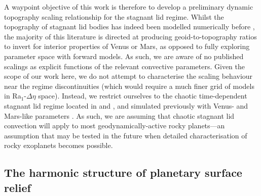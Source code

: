 A waypoint objective of this work is therefore to develop a preliminary dynamic topography scaling relationship for the stagnant lid regime. Whilst the topography of  stagnant lid bodies has indeed been modelled numerically before \citep{moresi_interpreting_1995, solomatov_stagnant_1996, vezolainen_timing_2003, vezolainen_uplift_2004, orth_isostatic_2011, golle_topography_2012, huang_constraints_2013}, the majority of this literature is directed at producing geoid-to-topography ratios to invert for interior properties of Venus or Mars, as opposed to fully exploring parameter space with forward models. As such, we are aware of no published scalings as explicit functions of the relevant convective parameters. Given the scope of our work here, we do not attempt to characterise the scaling behaviour near the regime discontinuities (which would require a much finer grid of models in Ra$_1$-$\Delta \eta$ space). Instead, we restrict ourselves to the chaotic time-dependent stagnant lid regime located in \citet{moresi_numerical_1995} and \citet{orth_isostatic_2011}, and simulated previously with Venus- and Mars-like parameters \citep{solomatov_scaling_2000, hauck_thermal_2002, reese_scaling_2005, orth_isostatic_2011}. As such, we are assuming that chaotic stagnant lid convection will apply to most geodynamically-active rocky planets---an assumption that may be tested in the future when detailed characterisation of rocky exoplanets becomes possible.




  

\subsection{The harmonic structure of planetary surface relief} \label{sec:intro-spectrum}

